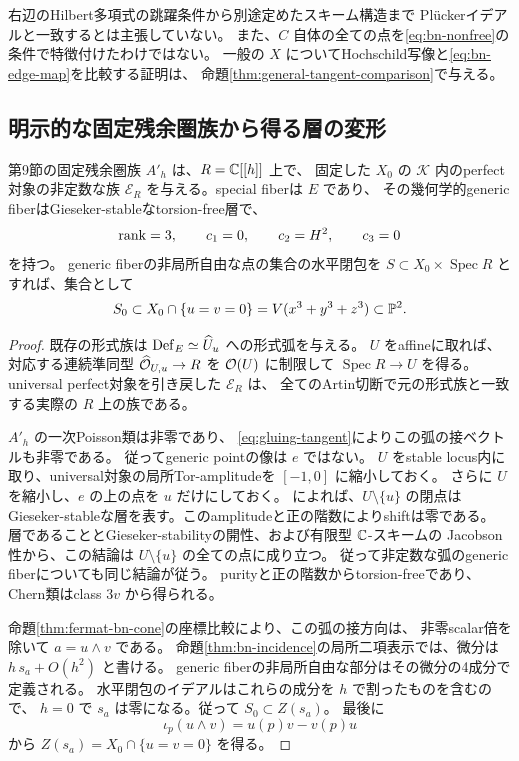 右辺のHilbert多項式の跳躍条件から別途定めたスキーム構造まで
Pl\"uckerイデアルと一致するとは主張していない。
また、$C$ 自体の全ての点を\eqref{eq:bn-nonfree}の条件で特徴付けたわけではない。
一般の $X$ についてHochschild写像と\eqref{eq:bn-edge-map}を比較する証明は、
命題\ref{thm:general-tangent-comparison}で与える。

\subsection{明示的な固定残余圏族から得る層の変形}

\begin{theorem}\label{thm:gluing-sheaf-arc}
第9節の固定残余圏族 $A'_h$ は、$R=\mathbb C[[h]]$ 上で、
固定した $X_0$ の $\mathcal K$ 内のperfect対象の非定数な族
$\mathcal E_R$ を与える。special fiberは $E$ であり、
その幾何学的generic fiberはGieseker-stableなtorsion-free層で、
\[
 \operatorname{rank}=3,\qquad c_1=0,\qquad c_2=H^2,\qquad c_3=0
\]
を持つ。
generic fiberの非局所自由な点の集合の水平閉包を
$S\subset X_0\times\operatorname{Spec}R$ とすれば、集合として
\[
 S_0\subset
 X_0\cap\{u=v=0\}
 =V(x^3+y^3+z^3)\subset\mathbb P^2.
\]
\end{theorem}

\begin{proof}
既存の形式族は
$\operatorname{Def}_E\simeq\widehat U_u$ への形式弧を与える。
$U$ をaffineに取れば、対応する連続準同型
$\widehat{\mathcal O}_{U,u}\to R$ を $\mathcal O(U)$ に制限して
$\operatorname{Spec}R\to U$ を得る。
universal perfect対象を引き戻した $\mathcal E_R$ は、
全てのArtin切断で元の形式族と一致する実際の $R$ 上の族である。

$A'_h$ の一次Poisson類は非零であり、
\eqref{eq:gluing-tangent}によりこの弧の接ベクトルも非零である。
従ってgeneric pointの像は $e$ ではない。
$U$ をstable locus内に取り、universal対象の局所Tor-amplitudeを
$[-1,0]$ に縮小しておく。
さらに $U$ を縮小し、$e$ の上の点を $u$ だけにしておく。
\cite[Proposition 5.5]{FLZ}によれば、$U\setminus\{u\}$ の閉点は
Gieseker-stableな層を表す。このamplitudeと正の階数によりshiftは零である。
層であることとGieseker-stabilityの開性、および有限型 $\mathbb C$-スキームの
Jacobson性から、この結論は $U\setminus\{u\}$ の全ての点に成り立つ。
従って非定数な弧のgeneric fiberについても同じ結論が従う。
purityと正の階数からtorsion-freeであり、Chern類はclass $3v$ から得られる。

命題\ref{thm:fermat-bn-cone}の座標比較により、この弧の接方向は、
非零scalar倍を除いて $a=u\wedge v$ である。
命題\ref{thm:bn-incidence}の局所二項表示では、微分は
$h\,s_a+O(h^2)$ と書ける。
generic fiberの非局所自由な部分はその微分の4成分で定義される。
水平閉包のイデアルはこれらの成分を $h$ で割ったものを含むので、
$h=0$ で $s_a$ は零になる。従って $S_0\subset Z(s_a)$。
最後に
\[
 \iota_p(u\wedge v)=u(p)v-v(p)u
\]
から $Z(s_a)=X_0\cap\{u=v=0\}$ を得る。
\end{proof}

